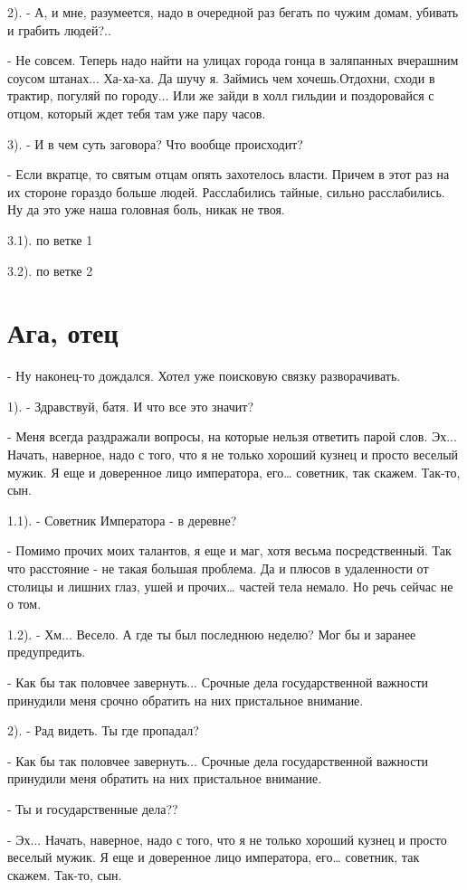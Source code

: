\documentclass[12pt,a4paper]{book}
\begin{document}
2). - А, и мне, разумеется, надо в очередной раз бегать по чужим домам, убивать и грабить людей?..

- Не совсем. Теперь надо найти на улицах города гонца в заляпанных вчерашним соусом штанах... Ха-ха-ха. Да шучу я. Займись чем хочешь.Отдохни, сходи в трактир, погуляй по городу... Или же зайди в холл гильдии и поздоровайся с отцом, который ждет тебя там уже пару часов.

3). - И в чем суть заговора? Что вообще происходит?

- Если вкратце, то святым отцам опять захотелось власти. Причем в этот раз на их стороне гораздо больше людей. Расслабились тайные, сильно расслабились. Ну да это уже наша головная боль, никак не твоя.

3.1). по ветке 1

3.2). по ветке 2

\section{Ага, отец}

- Ну наконец-то дождался. Хотел уже поисковую связку разворачивать.

1). - Здравствуй, батя. И что все это значит?

- Меня всегда раздражали вопросы, на которые нельзя ответить парой слов. Эх... Начать, наверное, надо с того, что я не только хороший кузнец и просто веселый мужик. Я еще и доверенное лицо императора, его… советник, так скажем. Так-то, сын.

1.1). - Советник Императора - в деревне?

- Помимо прочих моих талантов, я еще и маг, хотя весьма посредственный. Так что расстояние - не такая большая проблема. Да и плюсов в удаленности от столицы и лишних глаз, ушей и прочих… частей тела немало. Но речь сейчас не о том.

1.2). - Хм... Весело. А где ты был последнюю неделю? Мог бы и заранее предупредить.

- Как бы так половчее завернуть... Срочные дела государственной важности принудили меня срочно обратить на них пристальное внимание.

2). - Рад видеть. Ты где пропадал?

- Как бы так половчее завернуть... Срочные дела государственной важности принудили меня обратить на них пристальное внимание.

- Ты и государственные дела??

- Эх... Начать, наверное, надо с того, что я не только хороший кузнец и просто веселый мужик. Я еще и доверенное лицо императора, его… советник, так скажем. Так-то, сын.
\end{document}
